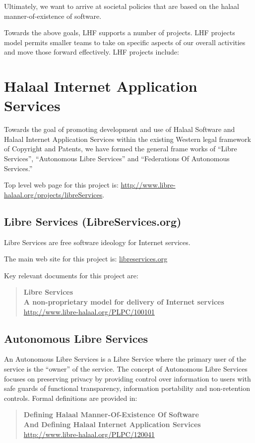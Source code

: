 Ultimately, we want to arrive at societal policies that are based on the halaal
manner-of-existence of software.

Towards the above goals, LHF supports a number of projects.  LHF projects model permits
smaller teams to take on specific aspects of our overall activities and move those forward
effectively.  LHF projects include:

\tableofcontents


\section{Halaal Internet Application Services}

Towards the goal of promoting development and use of Halaal Software and Halaal Internet
Application Services within the existing Western legal framework of Copyright and Patents,
we have formed the general frame works of ``Libre Services'', ``Autonomous Libre Services'' and 
``Federations Of Autonomous Services.''

Top level web page for this project is: \href{http://www.libre-halaal.org/projects/libreServices}{http://www.libre-halaal.org/projects/libreServices}.

\subsection{Libre Services (LibreServices.org)}

Libre Services are free software ideology for Internet services.

The main web site for this project is:
\href{http://www.libreservices.org}{libreservices.org}

Key relevant documents for this project are:

\begin{quote}
  \textbf{Libre Services}\\
  \textbf{A non-proprietary model for delivery of Internet services}\\
  \href{http://www.libre-halaal.org/PLPC/100101}{http://www.libre-halaal.org/PLPC/100101}
\end{quote}

\subsection{Autonomous Libre Services}

An Autonomous Libre Services is a Libre Service where the primary user of the service is
the ``owner'' of the service. 
The concept of Autonomous Libre Services focuses on preserving
privacy by providing control over information to users with safe guards of
functional transparency, information portability and non-retention controls.
Formal definitions are provided in:
\begin{quote}
  \textbf{Defining Halaal Manner-Of-Existence Of Software}\\
  \textbf{And Defining Halaal Internet Application Services}\\
  \href{http://www.libre-halaal.org/PLPC/120041}{http://www.libre-halaal.org/PLPC/120041}
\end{quote}

